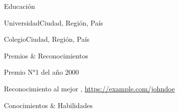 \documentclass[
	spanish, %
	letterpaper
]{article}
\def\name {John Doe}
\begin{document}
\begin{cvsblock}{Educación}
	\begin{institution}[]{Universidad}{Ciudad, Región, País}
	\end{institution}

	\begin{institution}{Colegio}{Ciudad, Región, País}
	\end{institution}
\end{cvsblock}

\begin{cvblocki}{Premios \& Reconocimientos}
	\item Premio N°1 del año 2000
	\item Reconocimiento al mejor , \url{https://example.com/johndoe}
\end{cvblocki}

\begin{cvblock}{Conocimientos \& Habilidades}
\end{cvblock}

\begin{signature}
	\signatureentry{\name}
\end{signature}

\end{document}
